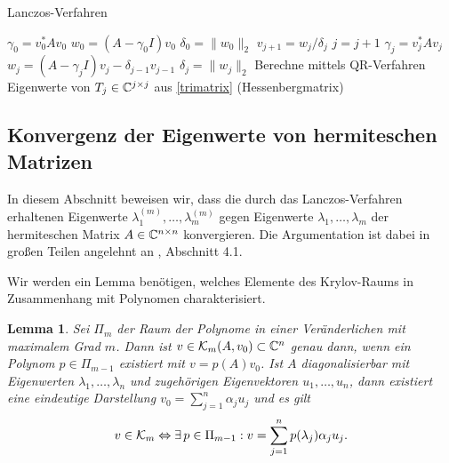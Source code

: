 \documentclass{article}
\theoremstyle{plain}
\newtheorem{lemma}      [theorem]{Lemma}
\begin{document}
\begin{algorithm}
	\label{Lanczos-Verfahren}
	\caption{Lanczos-Verfahren}
	\begin{algorithmic}[1]
		\State $\gamma_0 = v_0^*Av_0$
		\State $w_0 = (A-\gamma_0 I)v_0$
	  \State $\delta_0 = \|w_0\|_2$
		\State $v_{j+1} = w_j/\delta_j$
		\State $j = j+1$
		\State $\gamma_j = v_j^*Av_j$
		\State $w_j = (A-\gamma_j I)v_j - \delta_{j-1}v_{j-1}$
		\State $\delta_j = \|w_j\|_2$
		\EndWhile
		\State Berechne mittels QR-Verfahren Eigenwerte von $T_j \in \mathbb{C}^{j \times j}$ aus \ref{trimatrix} (Hessenbergmatrix)
	\end{algorithmic}
\end{algorithm}


\subsection{Konvergenz der Eigenwerte von hermiteschen Matrizen}\label{konvergenz}

In diesem Abschnitt beweisen wir, dass die durch das Lanczos-Verfahren erhaltenen Eigenwerte $\lambda_1^{(m)},\dots,\lambda_m^{(m)}$ gegen Eigenwerte $\lambda_1,\dots,\lambda_m$ der hermiteschen Matrix $A \in \mathbb{C}^{n \times n}$ konvergieren. Die Argumentation ist dabei in großen Teilen angelehnt an \cite{EWPs}, Abschnitt 4.1.

Wir werden ein Lemma benötigen, welches Elemente des Krylov-Raums in Zusammenhang mit Polynomen charakterisiert.

\begin{lemma}
	\label{v0_Polynom_Darstellung}
	Sei $\Pi_m$ der Raum der Polynome in einer Veränderlichen mit maximalem Grad $m$. Dann ist $v \in \mathcal{K}_m(A,v_0) \subset \mathbb{C}^n$ genau dann, wenn ein Polynom $p \in \Pi_{m-1}$ existiert mit $v = p(A)v_0$. \newline
	Ist $A$ diagonalisierbar mit Eigenwerten $\lambda_1, \dots, \lambda_n$ und zugehörigen Eigenvektoren $u_1, \dots, u_n$, dann existiert eine eindeutige Darstellung $v_0 = \sum_{j=1}^{n} \alpha_j u_j$ und es gilt
	\begin{align*}
		v \in \mathcal{K}_m \Leftrightarrow \exists \, p \in \Pi_{m-1}: v = \sum_{j=1}^{n} p(\lambda_j)\alpha_j u_j.
	\end{align*}
\end{lemma}
\end{document}
